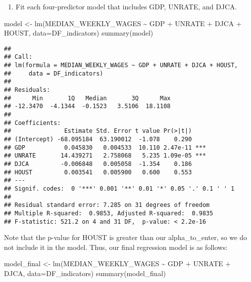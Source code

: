 \documentclass[
]{article}
\newenvironment{Shaded}{\begin{snugshade}}{\end{snugshade}}
\newcommand{\AttributeTok}[1]{\textcolor[rgb]{0.77,0.63,0.00}{#1}}
\newcommand{\FunctionTok}[1]{\textcolor[rgb]{0.00,0.00,0.00}{#1}}
\newcommand{\NormalTok}[1]{#1}
\newcommand{\OtherTok}[1]{\textcolor[rgb]{0.56,0.35,0.01}{#1}}
\newcommand{\SpecialCharTok}[1]{\textcolor[rgb]{0.00,0.00,0.00}{#1}}
\providecommand{\tightlist}{%
  \setlength{\itemsep}{0pt}\setlength{\parskip}{0pt}}
\begin{document}
\begin{enumerate}
\def\labelenumi{\arabic{enumi}.}
\setcounter{enumi}{3}
\tightlist
\item
  Fit each four-predictor model that includes GDP, UNRATE, and DJCA.
\end{enumerate}

\begin{Shaded}
\begin{Highlighting}[]
\NormalTok{model }\OtherTok{\textless{}{-}} \FunctionTok{lm}\NormalTok{(MEDIAN\_WEEKLY\_WAGES }\SpecialCharTok{\textasciitilde{}}\NormalTok{ GDP }\SpecialCharTok{+}\NormalTok{ UNRATE }\SpecialCharTok{+}\NormalTok{ DJCA }\SpecialCharTok{+}\NormalTok{ HOUST, }\AttributeTok{data=}\NormalTok{DF\_indicators)}
\FunctionTok{summary}\NormalTok{(model)}
\end{Highlighting}
\end{Shaded}

\begin{verbatim}
## 
## Call:
## lm(formula = MEDIAN_WEEKLY_WAGES ~ GDP + UNRATE + DJCA + HOUST, 
##     data = DF_indicators)
## 
## Residuals:
##      Min       1Q   Median       3Q      Max 
## -12.3470  -4.1344  -0.1523   3.5106  18.1108 
## 
## Coefficients:
##               Estimate Std. Error t value Pr(>|t|)    
## (Intercept) -68.095184  63.190012  -1.078    0.290    
## GDP           0.045830   0.004533  10.110 2.47e-11 ***
## UNRATE       14.439271   2.758068   5.235 1.09e-05 ***
## DJCA         -0.006848   0.005058  -1.354    0.186    
## HOUST         0.003541   0.005900   0.600    0.553    
## ---
## Signif. codes:  0 '***' 0.001 '**' 0.01 '*' 0.05 '.' 0.1 ' ' 1
## 
## Residual standard error: 7.285 on 31 degrees of freedom
## Multiple R-squared:  0.9853, Adjusted R-squared:  0.9835 
## F-statistic: 521.2 on 4 and 31 DF,  p-value: < 2.2e-16
\end{verbatim}

Note that the p-value for HOUST is greater than our alpha\_to\_enter, so
we do not include it in the model. Thus, our final regression model is
as follows:

\begin{Shaded}
\begin{Highlighting}[]
\NormalTok{model\_final }\OtherTok{\textless{}{-}} \FunctionTok{lm}\NormalTok{(MEDIAN\_WEEKLY\_WAGES }\SpecialCharTok{\textasciitilde{}}\NormalTok{ GDP }\SpecialCharTok{+}\NormalTok{ UNRATE }\SpecialCharTok{+}\NormalTok{ DJCA, }\AttributeTok{data=}\NormalTok{DF\_indicators)}
\FunctionTok{summary}\NormalTok{(model\_final)}
\end{Highlighting}
\end{Shaded}
\end{document}
